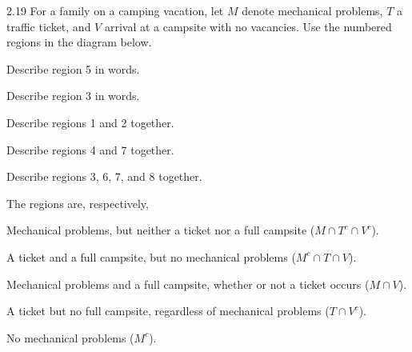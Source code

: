 \documentclass[11pt,oneside]{article}
\begin{document}
\begin{exercise}{2.19}
For a family on a camping vacation, let $M$ denote mechanical problems, $T$ a traffic ticket, and $V$ arrival at a campsite with no vacancies. Use the numbered regions in the diagram below.
\begin{center}
\end{center}

\par
\begin{exercisesubparts}
\item Describe region 5 in words.
\item Describe region 3 in words.
\item Describe regions 1 and 2 together.
\item Describe regions 4 and 7 together.
\item Describe regions 3, 6, 7, and 8 together.
\end{exercisesubparts}
\end{exercise}

\begin{solution}
The regions are, respectively,
\begin{exercisesubparts}
\item Mechanical problems, but neither a ticket nor a full campsite ($M\cap T^c\cap V^c$).
\item A ticket and a full campsite, but no mechanical problems ($M^c\cap T\cap V$).
\item Mechanical problems and a full campsite, whether or not a ticket occurs ($M\cap V$).
\item A ticket but no full campsite, regardless of mechanical problems ($T\cap V^c$).
\item No mechanical problems ($M^c$).
\end{exercisesubparts}
\end{solution}
\end{document}
